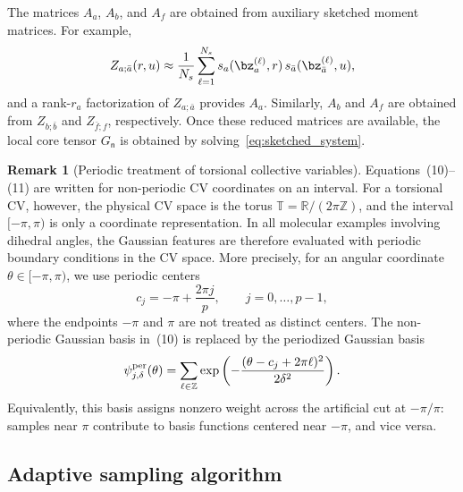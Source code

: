 \documentclass[a4paper,fleqn]{cas-sc}
\theoremstyle{definition}
\newtheorem{remark}[theorem]{Remark}
\begin{document}
The matrices $A_a$, $A_b$, and $A_f$ are obtained from auxiliary sketched moment matrices. For example,
\begin{equation}
    Z_{a;\bar a}(r,u)
    \approx
    \frac{1}{N_s}\sum_{\ell=1}^{N_s}
    s_a(\bz^{(\ell)}_a,r)\,
    s_{\bar a}(\bz^{(\ell)}_{\bar a},u),
    \label{eq:Zaabar_empirical}
\end{equation}
and a rank-$r_a$ factorization of $Z_{a;\bar a}$ provides $A_a$.
Similarly, $A_b$ and $A_f$ are obtained from $Z_{b;\bar b}$ and $Z_{\bar f;f}$, respectively.
Once these reduced matrices are available, the local core tensor $G_{\mathsf n}$ is obtained by solving~\eqref{eq:sketched_system}.
\begin{remark}[Periodic treatment of torsional collective variables]
Equations~(10)--(11) are written for non-periodic CV coordinates on an
interval. For a torsional CV, however, the physical CV space is the torus \(\mathbb T=\mathbb R/(2\pi\mathbb Z)\), and the interval
\([-\pi,\pi)\) is only a coordinate representation. In all molecular examples
involving dihedral angles, the Gaussian features are therefore evaluated with
periodic boundary conditions in the CV space.
More precisely, for an angular coordinate \(\theta\in[-\pi,\pi)\), we use
periodic centers
\[
    c_j=-\pi+\frac{2\pi j}{p},\qquad j=0,\ldots,p-1,
\]
where the endpoints \(-\pi\) and \(\pi\) are not treated as distinct centers.
The non-periodic Gaussian basis in~(10) is replaced by the periodized Gaussian
basis
\[
    \psi^{\rm per}_{j,\delta}(\theta)
    =
    \sum_{\ell\in\mathbb Z}
    \exp\left(
        -\frac{(\theta-c_j+2\pi \ell)^2}{2\delta^2}
    \right).
\]
Equivalently, this basis assigns nonzero weight across the artificial cut at
\(-\pi/\pi\): samples near \(\pi\) contribute to basis functions centered near
\(-\pi\), and vice versa.
\end{remark}

\subsection{Adaptive sampling algorithm} \label{subsec:adpative_sampling}
\end{document}
